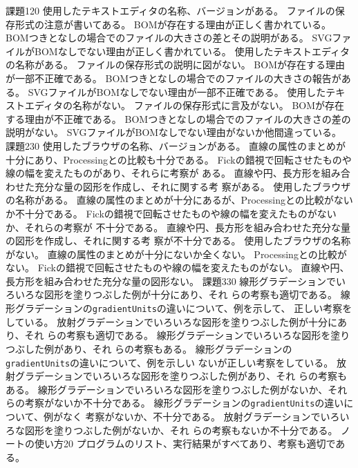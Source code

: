 \documentclass[a4j]{jreport}
\begin{document}
{{課題1}{20}{
	{使用したテキストエディタの名称、バージョンがある。}
	{ファイルの保存形式の注意が書いてある。}
  {BOMが存在する理由が正しく書かれている。}
  {BOMつきとなしの場合でのファイルの大きさの差とその説明がある。}
  {SVGファイルがBOMなしでない理由が正しく書かれている。}
	}
	{
	{使用したテキストエディタの名称がある。}
	{ファイルの保存形式の説明に図がない。}
  {BOMが存在する理由が一部不正確である。}
  {BOMつきとなしの場合でのファイルの大きさの報告がある。}
  {SVGファイルがBOMなしでない理由が一部不正確である。}
	}
	{
	{使用したテキストエディタの名称がない。}
	{ファイルの保存形式に言及がない。}
  {BOMが存在する理由が不正確である。}
  {BOMつきとなしの場合でのファイルの大きさの差の説明がない。}
  {SVGファイルがBOMなしでない理由がないか他間違っている。}
	}
	{課題2}{30}
	{
	{使用したブラウザの名称、バージョンがある。}
  {直線の属性のまとめが十分にあり、Processingとの比較も十分である。}
  {Fickの錯視で回転させたものや線の幅を変えたものがあり、それらに考察が
  ある。}
  {直線や円、長方形を組み合わせた充分な量の図形を作成し、それに関する考
  察がある。}
	}
	{
	{使用したブラウザの名称がある。}
  {直線の属性のまとめが十分にあるが、Processingとの比較がないか不十分である。}
  {Fickの錯視で回転させたものや線の幅を変えたものがないか、それらの考察が
  不十分である。}
  {直線や円、長方形を組み合わせた充分な量の図形を作成し、それに関する考
  察が不十分である。}
	}
	{
	{使用したブラウザの名称がない。}
  {直線の属性のまとめが十分にないか全くない。}
  {Processingとの比較がない。}
  {Fickの錯視で回転させたものや線の幅を変えたものがない。}
  {直線や円、長方形を組み合わせた充分な量の図形ない。}
	}
	{課題3}{30}
	{
  {線形グラデーションでいろいろな図形を塗りつぶした例が十分にあり、それ
  らの考察も適切である。}
  {線形グラデーションの\texttt{gradientUnits}の違いについて、例を示して、
  正しい考察をしている。}
  {放射グラデーションでいろいろな図形を塗りつぶした例が十分にあり、それ
  らの考察も適切である。}
	}
	{
  {線形グラデーションでいろいろな図形を塗りつぶした例があり、それ
  らの考察もある。}
  {線形グラデーションの\texttt{gradientUnits}の違いについて、例を示しい
  ないが正しい考察をしている。}
  {放射グラデーションでいろいろな図形を塗りつぶした例があり、それ
  らの考察もある。}
	}
	{
  {線形グラデーションでいろいろな図形を塗りつぶした例がないか、それ
  らの考察がないか不十分である。}
  {線形グラデーションの\texttt{gradientUnits}の違いについて、例がなく
  考察がないか、不十分である。}
  {放射グラデーションでいろいろな図形を塗りつぶした例がないか、それ
  らの考察もないか不十分である。}
	}
  {ノートの使い方}{20}
  {
  {プログラムのリスト、実行結果がすべてあり、考察も適切である。}
}}
\end{document}
